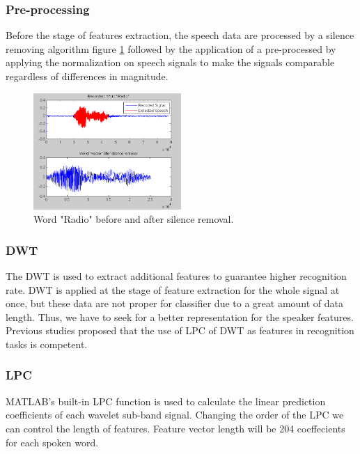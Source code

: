 \documentclass[12pt, a4paper, twoside]{report}
\begin{document}
\subsubsection{Pre-processing}
Before the stage of features extraction, the speech data are processed by a silence removing algorithm figure \ref{fig:dtw-sremove} followed by the application of a pre-processed by applying the normalization on speech signals to make the signals comparable regardless of differences in magnitude.
\begin{figure}[!h]
	\centering
	\includegraphics[width=0.5\textwidth]
	{images/chapter5/dtw-sremove}
	\caption{Word "Radio" before and after silence removal.}
	\label{fig:dtw-sremove}
\end{figure}

\subsubsection{DWT}
The DWT is used to extract additional features to guarantee higher recognition rate. DWT is applied at the stage of feature extraction for the whole signal at once, but these data are not proper for classifier due to a great amount of data length. Thus, we have to seek for a better representation for the speaker features. Previous studies proposed that the use of LPC of DWT as features in recognition tasks is competent.
\subsubsection{LPC}
MATLAB's built-in LPC function is used to calculate the linear prediction coefficients of each wavelet sub-band signal. Changing the order of the LPC we can control the length of features. Feature vector length will be 204 coeffecients for each spoken word.
\end{document}

